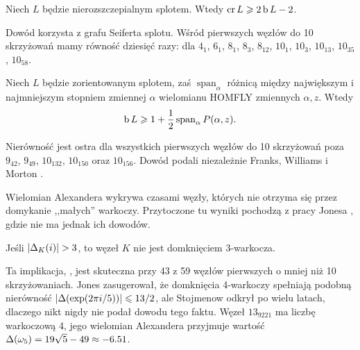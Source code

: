 \begin{proposition}
    Niech $L$ będzie nierozszczepialnym splotem.
    Wtedy $\operatorname{cr} L \geqslant 2 \operatorname{b} L - 2$.
\end{proposition}

Dowód korzysta z grafu Seiferta splotu.
%
Wśród pierwszych węzłów do 10 skrzyżowań mamy równość dziesięć razy: dla $4_1$, $6_1$, $8_1$, $8_3$, $8_{12}$, $10_1$, $10_3$, $10_{13}$, $10_{35}$, $10_{58}$.

\begin{proposition}
%
    Niech $L$ będzie zorientowanym splotem, zaś $\operatorname{span}_\alpha$ różnicą między największym i najmniejszym stopniem zmiennej $\alpha$ wielomianu HOMFLY zmiennych $\alpha, z$.
    Wtedy
    \begin{equation}
        \operatorname{b} L \geqslant 1 + \frac 1 2 \operatorname{span}_\alpha P(\alpha, z).
    \end{equation}
\end{proposition}

Nierówność jest ostra dla wszystkich pierwszych węzłów do 10 skrzyżowań poza $9_{42}$, $9_{49}$, $10_{132}$, $10_{150}$ oraz $10_{156}$.
Dowód podali niezależnie Franks, Williams \cite{franks1987} i Morton \cite{morton1988}.
%
%
%

Wielomian Alexandera wykrywa czasami węzły, których nie otrzyma się przez domykanie ,,małych'' warkoczy.
%
Przytoczone tu wyniki pochodzą z pracy Jonesa \cite{jones1985}, gdzie nie ma jednak ich dowodów.

\begin{proposition}
    Jeśli $|\Delta_K(i)| > 3$, to węzeł $K$ nie jest domknięciem 3-warkocza.
\end{proposition}

Ta implikacja, \cite[wniosek 23]{jones1985}, jest skuteczna przy 43 z 59 węzłów pierwszych o mniej niż 10 skrzyżowaniach.
Jones \cite[wniosek 24]{jones1985} zasugerował, że domknięcia 4-warkoczy spełniają podobną nierówność $|\Delta (\exp (2\pi i / 5))| \leqslant 13/2$, ale Stojmenow \cite{stoimenow2002} odkrył po wielu latach, dlaczego nikt nigdy nie podał dowodu tego faktu.
Węzeł $13_{9221}$ ma liczbę warkoczową 4, jego wielomian Alexandera przyjmuje wartość $\Delta(\omega_5) = 19\sqrt{5} - 49 \approx -6.51$.


